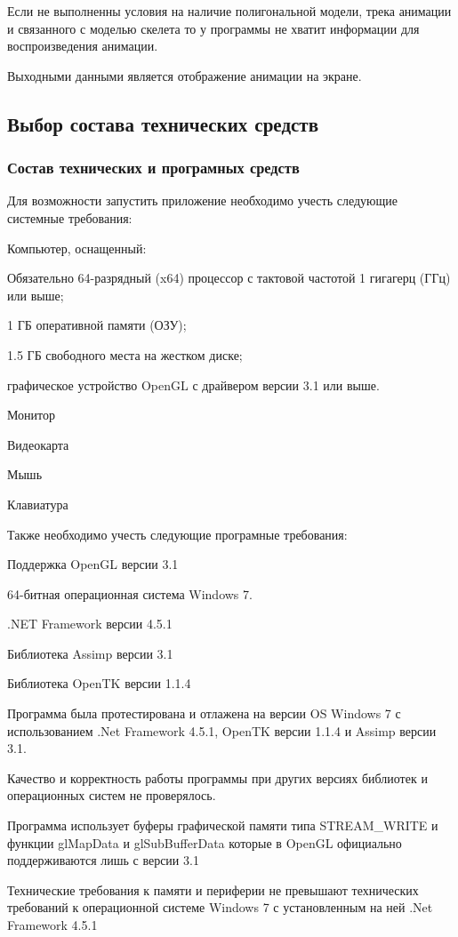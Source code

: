 Если не выполненны условия на наличие полигональной модели,
трека анимации и связанного с моделью скелета то
у программы не хватит информации для воспроизведения анимации.

Выходными данными является отображение анимации на экране.


\subsection{Выбор состава технических средств}

\subsubsection{Состав технических и програмных средств}
Для возможности запустить приложение необходимо учесть следующие системные требования:
\begin{my_enumerate}
\item Компьютер, оснащенный:
    \begin{my_enumerate}
    \item Обязательно 64-разрядный (x64) процессор с тактовой частотой 1 гигагерц (ГГц) или выше;
    \item 1 ГБ оперативной памяти (ОЗУ);
    \item 1.5 ГБ свободного места на жестком диске;
    \item графическое устройство OpenGL с драйвером версии 3.1 или выше.
    \end{my_enumerate}
\item Монитор
\item Видеокарта
\item Мышь
\item Клавиатура
\end{my_enumerate}
\bigskip

Также необходимо учесть следующие програмные требования:
\begin{my_enumerate}
\item Поддержка OpenGL версии 3.1
\item 64-битная операционная система Windows 7.
\item .NET Framework версии 4.5.1
\item Библиотека Assimp версии 3.1
\item Библиотека OpenTK версии 1.1.4
\end{my_enumerate}

Программа была протестирована и отлажена на версии OS Windows 7 с использованием .Net Framework 4.5.1, OpenTK версии 1.1.4 и Assimp версии 3.1.

Качество и корректность работы программы при других версиях библиотек и операционных систем не проверялось.

Программа использует буферы графической памяти типа STREAM\_WRITE и функции glMapData и glSubBufferData которые в OpenGL официально поддерживаются лишь с версии 3.1

Технические требования к памяти и периферии не превышают технических требований к операционной системе Windows 7 с установленным на ней .Net Framework 4.5.1
